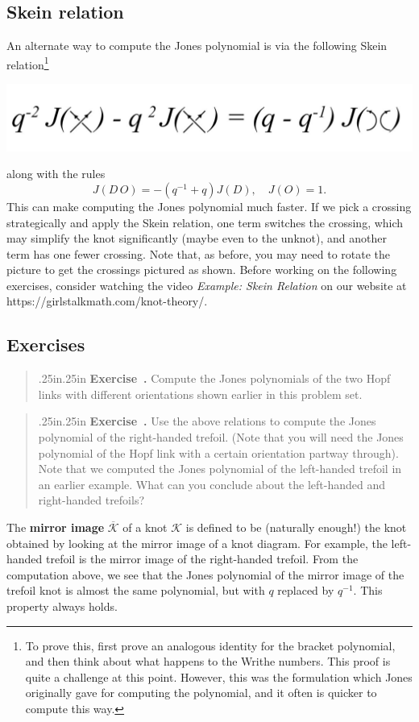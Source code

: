 \documentclass[12 pt]{article}
\newcounter{exercise}[section]
\newenvironment{exercise}{\refstepcounter{exercise}\par\bigskip \begin{quotation}{}{\leftmargin .25in\rightmargin .25in}
	\noindent \textbf{Exercise~\thesection.\theexercise }  \rmfamily}{\end{quotation}\par\bigskip}
\begin{document}
\subsection{Skein relation}
An alternate way to compute the Jones polynomial is via the following Skein relation\footnote{To prove this, first prove an analogous identity for the bracket polynomial, and then think about what happens to the Writhe numbers. This proof is quite a challenge at this point. However, this was the formulation which Jones originally gave for computing the polynomial, and it often is quicker to compute this way.}
\begin{center}
\includegraphics[height = .5in]{jones_property.jpg}
\end{center}
along with the rules
$$J(D\,O)=-(q^{-1}+q)J(D),\quad J(O)=1.$$
This can make computing the Jones polynomial much faster. If we pick a crossing strategically and apply the Skein relation, one term switches the crossing, which may simplify the knot significantly (maybe even to the unknot), and another term has one fewer crossing. Note that, as before, you may need to rotate the picture to get the crossings pictured as shown. Before working on the following exercises, consider watching the video {\it Example: Skein Relation} on our website at https://girlstalkmath.com/knot-theory/.

\subsection{Exercises}

\begin{exercise}
Compute the Jones polynomials of the two Hopf links with different orientations shown earlier in this problem set.
\end{exercise}

\begin{exercise}
Use the above relations to compute the Jones polynomial of the right-handed trefoil. (Note that you will need the Jones polynomial of the Hopf link with a certain orientation partway through). Note that we computed the Jones polynomial of the left-handed trefoil in an earlier example. What can you conclude about the left-handed and right-handed trefoils?
\end{exercise}

The \textbf{mirror image} $\overline{\mathcal{K}}$ of a knot $\mathcal{K}$ is defined to be (naturally enough!) the knot obtained by looking at the mirror image of a knot diagram. For example, the left-handed trefoil is the mirror image of the right-handed trefoil. From the computation above, we see that the Jones polynomial of the mirror image of the trefoil knot is almost the same polynomial, but with $	q$ replaced by $q^{-1}$. This property always holds.
\end{document}
